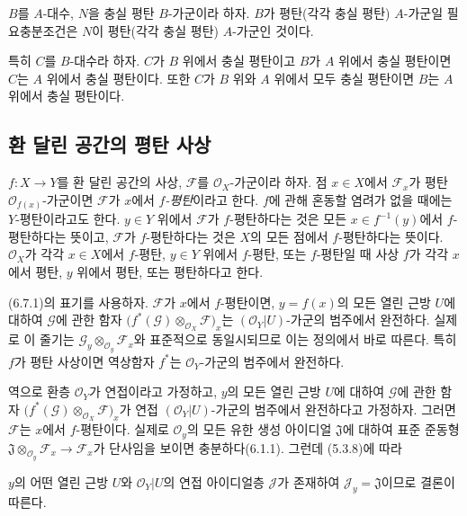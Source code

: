 \begin{env}[6.6.4]
\label{0.6.6.4-ko}
$B$를 $A$-대수, $N$을 충실 평탄 $B$-가군이라 하자. $B$가
평탄(각각 충실 평탄) $A$-가군일 필요충분조건은 $N$이
평탄(각각 충실 평탄) $A$-가군인 것이다.

특히 $C$를 $B$-대수라 하자. $C$가 $B$ 위에서 충실 평탄이고
$B$가 $A$ 위에서 충실 평탄이면 $C$는 $A$ 위에서 충실 평탄이다.
또한 $C$가 $B$ 위와 $A$ 위에서 모두 충실 평탄이면 $B$는 $A$
위에서 충실 평탄이다.
\end{env}

\subsection{환 달린 공간의 평탄 사상}
\label{subsection:0.6.7-ko}

\begin{env}[6.7.1]
\label{0.6.7.1-ko}
$f:X\to Y$를 환 달린 공간의 사상, $\mathcal F$를
$\mathcal O_X$-가군이라 하자. 점 $x\in X$에서 $\mathcal F_x$가
평탄 $\mathcal O_{f(x)}$-가군이면 $\mathcal F$가 $x$에서
\emph{$f$-평탄}이라고 한다. $f$에 관해 혼동할 염려가 없을 때에는
$Y$-평탄이라고도 한다. $y\in Y$ 위에서 $\mathcal F$가
$f$-평탄하다는 것은 모든 $x\in f^{-1}(y)$에서 $f$-평탄하다는
뜻이고, $\mathcal F$가 $f$-평탄하다는 것은 $X$의 모든 점에서
$f$-평탄하다는 뜻이다. $\mathcal O_X$가 각각 $x\in X$에서
$f$-평탄, $y\in Y$ 위에서 $f$-평탄, 또는 $f$-평탄일 때 사상
$f$가 각각 $x$에서 평탄, $y$ 위에서 평탄, 또는 평탄하다고 한다.
\end{env}

\begin{env}[6.7.2]
\label{0.6.7.2-ko}
(6.7.1)의 표기를 사용하자. $\mathcal F$가 $x$에서 $f$-평탄이면,
$y=f(x)$의 모든 열린 근방 $U$에 대하여 $\mathcal G$에 관한 함자
$\bigl(f^*(\mathcal G)\otimes_{\mathcal O_X}\mathcal F\bigr)_x$는
$(\mathcal O_Y|U)$-가군의 범주에서 완전하다. 실제로 이 줄기는
$\mathcal G_y\otimes_{\mathcal O_y}\mathcal F_x$와 표준적으로
동일시되므로 이는 정의에서 바로 따른다. 특히
$f$가 평탄 사상이면 역상함자 $f^*$는 $\mathcal O_Y$-가군의
범주에서 완전하다.
\end{env}

\begin{env}[6.7.3]
\label{0.6.7.3-ko}
역으로 환층 $\mathcal O_Y$가 연접이라고 가정하고, $y$의 모든 열린
근방 $U$에 대하여 $\mathcal G$에 관한 함자
$\bigl(f^*(\mathcal G)\otimes_{\mathcal O_X}\mathcal F\bigr)_x$가
연접 $(\mathcal O_Y|U)$-가군의 범주에서 완전하다고 가정하자.
그러면 $\mathcal F$는 $x$에서 $f$-평탄이다. 실제로
$\mathcal O_y$의 모든 유한 생성 아이디얼 $\mathfrak J$에 대하여
표준 준동형
$\mathfrak J\otimes_{\mathcal O_y}\mathcal F_x\to\mathcal F_x$가
단사임을 보이면 충분하다(6.1.1). 그런데 (5.3.8)에 따라


$y$의 어떤 열린 근방 $U$와 $\mathcal O_Y|U$의 연접 아이디얼층
$\mathcal J$가 존재하여 $\mathcal J_y=\mathfrak J$이므로 결론이
따른다.
\end{env}

